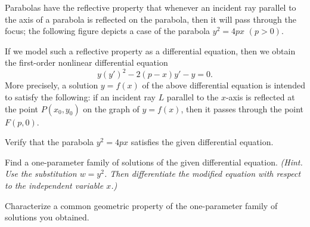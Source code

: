 \documentclass[11pt,oneside]{article}
\begin{document}
\begin{problem}
Parabolas have the reflective property that whenever an incident ray parallel to the axis of a parabola is reflected on the parabola, then it will pass through the focus; the following figure depicts a case of the parabola $y^2=4px$ $(p>0)$.

\begin{center}
\end{center}

If we model such a reflective property as a differential equation, then we obtain the first-order nonlinear differential equation
\[
y(y')^2-2(p-x)y'-y=0.
\]
More precisely, a solution $y=f(x)$ of the above differential equation is intended to satisfy the following: if an incident ray $L$ parallel to the $x$-axis is reflected at the point $P(x_0,y_0)$ on the graph of $y=f(x)$, then it passes through the point $F(p,0)$.
\begin{problemsubparts}
\item Verify that the parabola $y^2=4px$ satisfies the given differential equation.
\item Find a one-parameter family of solutions of the given differential equation. \textit{(Hint. Use the substitution $w=y^2$. Then differentiate the modified equation with respect to the independent variable $x$.)}
\item Characterize a common geometric property of the one-parameter family of solutions you obtained.
\end{problemsubparts}
\end{problem}
\end{document}
